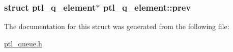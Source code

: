 \hypertarget{structptl__q__element_3df32d19d7ad8316fd89b1d2f4af0ab1}{
\subsubsection{\setlength{\rightskip}{0pt plus 5cm}struct {\bf ptl\_\-q\_\-element}$\ast$ {\bf ptl\_\-q\_\-element::prev}}}
\label{structptl__q__element_3df32d19d7ad8316fd89b1d2f4af0ab1}




The documentation for this struct was generated from the following file:\begin{CompactItemize}
\item 
\hyperlink{ptl__queue_8h}{ptl\_\-queue.h}\end{CompactItemize}
